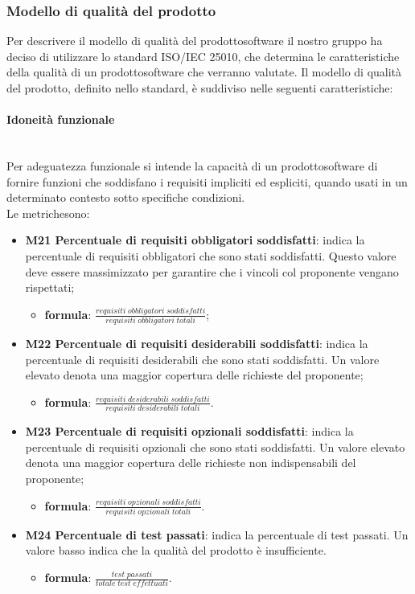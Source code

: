 \subsubsection{Modello di qualità del prodotto} 
Per descrivere il modello di qualità del prodotto\glosp software il nostro gruppo ha deciso di utilizzare lo standard ISO/IEC 25010, che determina le caratteristiche della qualità di un prodotto\glosp software che verranno valutate. Il modello di qualità del prodotto\glo, definito nello standard, è suddiviso nelle seguenti caratteristiche:
	\paragraph{Idoneità funzionale} \mbox{}\\[1mm]
	Per adeguatezza funzionale si intende la capacità di un prodotto\glosp software di fornire funzioni che soddisfano i requisiti impliciti ed espliciti, quando usati in un determinato contesto sotto specifiche condizioni. \\
	Le metriche\glosp sono:
	\begin{itemize}
		\item \textbf{M21 Percentuale di requisiti obbligatori soddisfatti}: indica la percentuale di requisiti obbligatori che sono stati soddisfatti. Questo valore deve essere massimizzato per garantire che i vincoli col proponente vengano rispettati;
		\begin{itemize}
			\item[] \textbf{formula}: $\frac{requisiti \; obbligatori \; soddisfatti}{requisiti \; obbligatori \; totali}$;
		\end{itemize} 
		\item \textbf{M22 Percentuale di requisiti desiderabili soddisfatti}:
		indica la percentuale di requisiti desiderabili che sono stati soddisfatti. Un valore elevato denota una maggior copertura delle richieste del proponente;
		\begin{itemize}
			\item[] \textbf{formula}: $\frac{requisiti \; desiderabili \; soddisfatti}{requisiti \; desiderabili \; totali}$.
		\end{itemize} 
		\item \textbf{M23 Percentuale di requisiti opzionali soddisfatti}:
		indica la percentuale di requisiti opzionali che sono stati soddisfatti. Un valore elevato denota una maggior copertura delle richieste non indispensabili  del proponente;
		\begin{itemize}
			\item[] \textbf{formula}: $\frac{requisiti \; opzionali \; soddisfatti}{requisiti \; opzionali \; totali}$.
		\end{itemize} 
		\item \textbf{M24 Percentuale di test passati}:
		indica la percentuale di test passati. Un valore basso indica che la qualità del prodotto è insufficiente. 
		\begin{itemize}
			\item[] \textbf{formula}: $\frac{test \; passati}{totale \; test \; effettuati}$.
		\end{itemize}
	\end{itemize}

